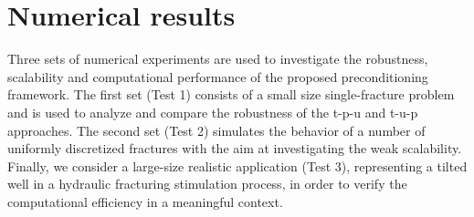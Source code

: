 \documentclass[3p,times]{elsarticle}
\theoremstyle{plain}
\newcommand{\Mat}[1]{#1}
\newcommand{\tH}{\widetilde{H}}
\begin{document}





\section{Numerical results}
\label{sec:numres}

Three sets of numerical experiments are used to investigate the robustness, scalability and computational performance of the proposed preconditioning framework. The first set (Test 1) consists of a small size single-fracture problem and is used to analyze and compare the robustness of the t-p-u and t-u-p approaches. The second set (Test 2) simulates the behavior of a number of uniformly discretized fractures with the aim at investigating the weak scalability. Finally, we consider a large-size realistic application (Test 3), representing a tilted well in a hydraulic fracturing stimulation process, in order to verify the computational efficiency in a meaningful context.
\end{document}

